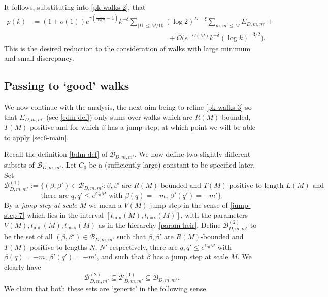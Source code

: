 \documentclass[11pt,reqno]{amsart}
\numberwithin{equation}{section}
\theoremstyle{definition}
\theoremstyle{remark}
\renewcommand{\le}{\leqslant}
\begin{document}
It follows, substituting into \cref{pk-walks-2}, that 
\begin{align} \nonumber p(k) & =  (1 + o(1)) e^{\gamma(\frac{1}{\log 2} - 1)} k^{-\delta}  \sum_{|D| \le M/10} (\log 2)^{D - \xi}\sum_{m,m' \le M} E_{D,m,m'} + \\[5pt] & \hspace{8cm}  +  O \big( e^{-\Omega(M)}k^{-\delta} (\log k)^{-3/2}\big).\label{pk-walks-3}\end{align}
This is the desired reduction to the consideration of walks with large minimum and small discrepancy. 


\subsection{Passing to `good' walks}

We now continue with the analysis, the next aim being to refine \cref{pk-walks-3} so that $E_{D,m,m'}$ (see \cref{edm-def}) only sums over walks which are $R(M)$-bounded, $T(M)$-positive and for which $\beta$ has a jump step, at which point we will be able to apply \cref{sec6-main}.

Recall the definition \cref{bdm-def} of $\mathscr{B}_{D, m, m'}$. We now define two slightly different subsets of $\mathscr{B}_{D,m,m'}$. Let $C_0$ be a (sufficiently large) constant to be specified later. Set
\[ \mathscr{B}^{(1)}_{D,m,m'} := \{(\beta, \beta') \in \mathscr{B}_{D,m,m'} : \beta,\beta' \; \mbox{are $R(M)$-bounded and $T(M)$-positive to length $L(M)$ and}\]
\begin{equation}\label{b1-def} \mbox{there are $q, q' \le e^{C_0 M}$ with $\beta(q) = -m$, $\beta'(q') = -m'$}\}.\end{equation} 
By a \emph{jump step at scale $M$} we mean a $V(M)$-jump step in the sense of \cref{jump-step-7} which lies in the interval $[t_{\min}(M), t_{\max}(M)]$, with the parameters $V(M), t_{\min}(M), t_{\max}(M)$ as in the hierarchy \cref{param-heir}. Define $\mathscr{B}^{(2)}_{D,m,m'}$ to be the set of all $(\beta, \beta') \in \mathscr{B}_{D,m,m'}$ such that $\beta,\beta'$ are $R(M)$-bounded and $T(M)$-positive to lengths $N$, $N'$ respectively, there are $q, q' \le e^{C_0 M}$ with $\beta(q) = -m$, $\beta'(q') = -m'$, and such that $\beta$ has a jump step at scale $M$.
We clearly have
\begin{equation}\label{nesting} \mathscr{B}^{(2)}_{D,m,m'} \subseteq \mathscr{B}^{(1)}_{D,m,m'} \subseteq \mathscr{B}_{D,m,m'}.\end{equation} 
We claim that both these sets are `generic' in the following sense.
\end{document}

